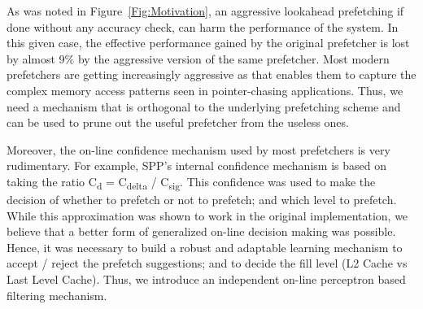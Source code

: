 

As was noted in Figure~\ref{Fig:Motivation}, an aggressive lookahead 
prefetching if done without any accuracy check, can harm the performance 
of the system. In this given case, the effective performance gained
by the original prefetcher is lost by almost 9\% by the aggressive version 
of the same prefetcher. Most modern prefetchers are getting increasingly 
aggressive as that enables them to capture the complex memory access patterns 
seen in pointer-chasing applications. Thus, we need a mechanism that is 
orthogonal to the underlying prefetching scheme and can be used
to prune out the useful prefetcher from the useless ones. 

Moreover, the on-line confidence mechanism used by most prefetchers is very
rudimentary. For example, SPP's internal confidence mechanism is based on
taking the ratio C\textsubscript{d} = C\textsubscript{delta} /
C\textsubscript{sig}. This confidence was used to make the decision of
whether to prefetch or not to prefetch; and which level to prefetch. While
this approximation was shown to work in the original implementation, we
believe that a better form of generalized on-line decision making was
possible. Hence, it was necessary to build a robust and adaptable learning
mechanism to accept / reject the prefetch suggestions; and to decide the fill
level (L2 Cache vs Last Level Cache). Thus, we introduce an independent
on-line perceptron based filtering mechanism.

